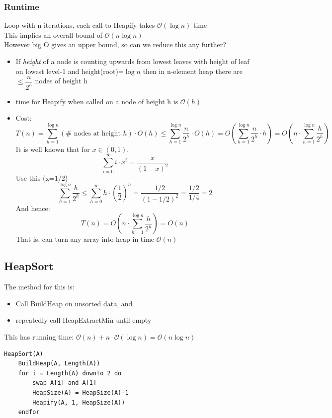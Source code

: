 \documentclass{article}[18pt]
\begin{document}
\subsubsection{Runtime}
Loop with n iterations, each call to Heapify takes $\mathcal{O}(\log n)$ time\\
This implies an overall bound of $\mathcal{O}(n\log n)$\\
However big O gives an upper bound, so can we reduce this any further?\\
\begin{itemize}
	\item If \textit{height} of a node is counting upwards from lowest leaves with height of leaf on lowest level-1 and height(root)=$\log n$ then in n-element heap there are $\leqslant \dfrac{n}{2^h}$ nodes of height h
	\item time for Heapify when called on a node of height h is $\mathcal{O}(h)$
	\item Cost:
$$T ( n ) = \sum _ { h = 1 } ^ { \log n } ( \# \text { nodes at height } h ) \cdot O ( h ) \leq \sum _ { h = 1 } ^ { \log n } \frac { n } { 2 ^ { h } } \cdot O ( h ) = O \left( \sum _ { h = 1 } ^ { \log n } \frac { n } { 2 ^ { h } } \cdot h \right) = O \left( n \cdot \sum _ { h = 1 } ^ { \log n } \frac { h } { 2 ^ { h } } \right)$$
It is well known that for $x\in (0,1)$,
$$\sum _ { i = 0 } ^ { \infty } i \cdot x ^ { i } = \frac { x } { ( 1 - x ) ^ { 2 } }$$
Use this (x=1/2)
$$\sum _ { h = 1 } ^ { \log n } \frac { h } { 2 ^ { h } } \leq \sum _ { h = 0 } ^ { \infty } h \cdot \left( \frac { 1 } { 2 } \right) ^ { h }	= \frac { 1 / 2 } { ( 1 - 1 / 2 ) ^ { 2 } } = \frac { 1 / 2 } { 1 / 4 } = 2$$
And hence:
$$T ( n ) = O \left( n \cdot \sum _ { h = 1 } ^ { \log n } \frac { h } { 2 ^ { h } } \right) = O ( n )$$
That is, can turn any array into heap in time $\mathcal{O}(n)$
\end{itemize}
\subsection{HeapSort}
The method for this is:
\begin{itemize}
	\item Call BuildHeap on unsorted data, and 
	\item repeatedly call HeapExtractMin until empty
\end{itemize}
This has running time: $\mathcal{O}(n)+n\cdot\mathcal{O}(\log n)=\mathcal{O}(n\log n)$
\begin{lstlisting}
HeapSort(A)
	BuildHeap(A, Length(A))
	for i = Length(A) downto 2 do
		swap A[i] and A[1]
		HeapSize(A) = HeapSize(A)-1
		Heapify(A, 1, HeapSize(A))
	endfor
\end{lstlisting}
\end{document}
